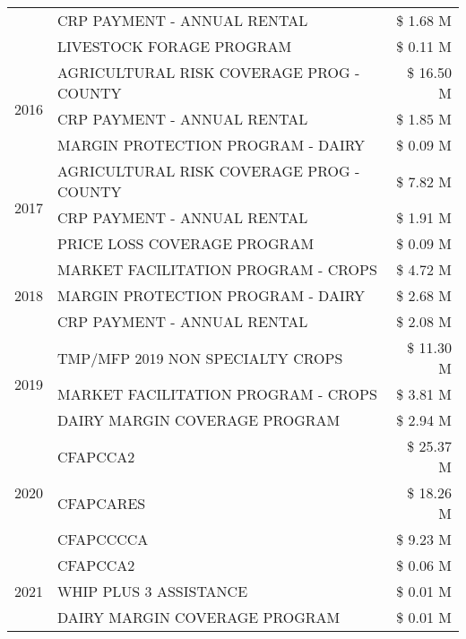 \begin{tabular}{llr}
 & CRP PAYMENT - ANNUAL RENTAL & \$ 1.68 M \\
 & LIVESTOCK FORAGE PROGRAM & \$ 0.11 M \\
\cline{1-3}
\multirow[t]{3}{*}{2016} & AGRICULTURAL RISK COVERAGE PROG - COUNTY & \$ 16.50 M \\
 & CRP PAYMENT - ANNUAL RENTAL & \$ 1.85 M \\
 & MARGIN PROTECTION PROGRAM - DAIRY & \$ 0.09 M \\
\cline{1-3}
\multirow[t]{3}{*}{2017} & AGRICULTURAL RISK COVERAGE PROG - COUNTY & \$ 7.82 M \\
 & CRP PAYMENT - ANNUAL RENTAL & \$ 1.91 M \\
 & PRICE LOSS COVERAGE PROGRAM & \$ 0.09 M \\
\cline{1-3}
\multirow[t]{3}{*}{2018} & MARKET FACILITATION PROGRAM - CROPS & \$ 4.72 M \\
 & MARGIN PROTECTION PROGRAM - DAIRY & \$ 2.68 M \\
 & CRP PAYMENT - ANNUAL RENTAL & \$ 2.08 M \\
\cline{1-3}
\multirow[t]{3}{*}{2019} & TMP/MFP 2019 NON SPECIALTY CROPS & \$ 11.30 M \\
 & MARKET FACILITATION PROGRAM - CROPS & \$ 3.81 M \\
 & DAIRY MARGIN COVERAGE PROGRAM & \$ 2.94 M \\
\cline{1-3}
\multirow[t]{3}{*}{2020} & CFAPCCA2 & \$ 25.37 M \\
 & CFAPCARES & \$ 18.26 M \\
 & CFAPCCCCA & \$ 9.23 M \\
\cline{1-3}
\multirow[t]{3}{*}{2021} & CFAPCCA2 & \$ 0.06 M \\
 & WHIP PLUS 3 ASSISTANCE & \$ 0.01 M \\
 & DAIRY MARGIN COVERAGE PROGRAM & \$ 0.01 M \\
\cline{1-3}
\bottomrule
\end{tabular}
